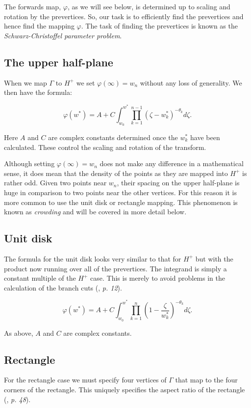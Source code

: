 \documentclass[a4paper,10pt]{amsart}
\newcommand{\sch}{Schwarz-Christoffel }
\renewcommand{\phi}{\varphi}
\begin{document}
The forwards map, $\phi$, as we will see below, is determined up to scaling and rotation by the prevertices. So, our task is to efficiently find the prevertices and hence find the mapping $\phi$. The task of finding the prevertices is known as the \emph{\sch parameter problem}.


\subsection{The upper half-plane}

When we map $\Gamma$ to $H^+$ we set $\phi(\infty) = w_n$ without any loss of generality. We then have the formula:

\begin{equation}
\phi(w^*) = A + C \int^{w^*}_{w_0} \prod_{k=1}^{n-1} (\zeta-w^*_k)^{-\theta_k} d\zeta.
\end{equation}

Here $A$ and $C$ are complex constants determined once the $w^*_k$ have been calculated. These control the scaling and rotation of the transform.

Although setting $\phi(\infty) = w_n$ does not make any difference in a mathematical sense, it does mean that the density of the points as they are mapped into $H^+$ is rather odd. Given two points near $w_n$, their spacing on the upper half-plane is huge in comparison to two points near the other vertices. For this reason it is more common to use the unit disk or rectangle mapping. This phenomenon is known as \emph{crowding} and will be covered in more detail below.

\subsection{Unit disk}

The formula for the unit disk looks very similar to that for $H^+$ but with the product now running over all of the prevertices. The integrand is simply a constant multiple of the $H^+$ case. This is merely to avoid problems in the calculation of the branch cuts (\cite{driscoll}, \emph{p. 12}).

\begin{equation}
\label{unitscmap}
\phi(w^*) = A + C \int^{w^*}_{w_0} \prod_{k=1}^{n} (1 - \frac{\zeta}{w^*_k})^{-\theta_k} d\zeta.
\end{equation}

As above, $A$ and $C$ are complex constants.

\subsection{Rectangle}
For the rectangle case we must specify four vertices of $\Gamma$ that map to the four corners of the rectangle. This uniquely specifies the aspect ratio of the rectangle (\cite{driscoll}, \emph{p. 48}).
\end{document}
